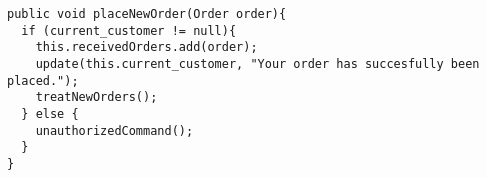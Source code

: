 \begin{lstlisting}[caption=Method to place an \texttt{Order} of \texttt{Core}.,
label=lst:placeOrder]
public void placeNewOrder(Order order){
  if (current_customer != null){
  	this.receivedOrders.add(order);
  	update(this.current_customer, "Your order has succesfully been placed.");
  	treatNewOrders();
  } else {
  	unauthorizedCommand();
  }
}
\end{lstlisting}

\lstset{basicstyle=\rm\small\ttfamily}
